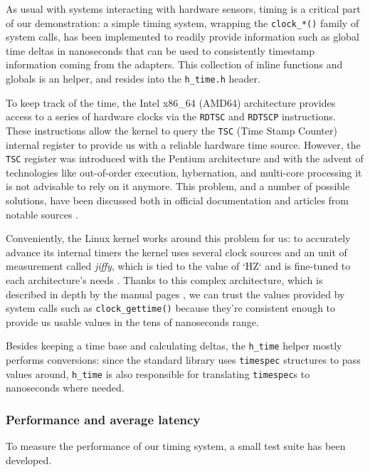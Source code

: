 \documentclass[a4paper,12pt]{report}
\begin{document}
As usual with systems interacting with hardware sensors, timing is a critical part of our demonstration: a simple timing system, wrapping the \texttt{clock\_*()} family of system calls, has been implemented to readily provide information such as global time deltas in nanoseconds that can be used to consistently timestamp information coming from the adapters. This collection of inline functions and globals is an helper, and resides into the \texttt{h\_time.h} header. 

To keep track of the time, the Intel x86\_64 (AMD64) architecture provides access to a series of hardware clocks via the \texttt{RDTSC} and \texttt{RDTSCP} instructions. These instructions allow the kernel to query the \texttt{TSC} (Time Stamp Counter) internal register to provide us with a reliable hardware time source. However, the \texttt{TSC} register was introduced with the Pentium architecture and with the advent of technologies like out-of-order execution, hybernation, and multi-core processing it is not advisable to rely on it anymore. This problem, and a number of possible solutions, have been discussed both in official documentation \cite{intel-rdtsc-bench} and articles from notable sources \cite{ms-rdtsc-issues}.

Conveniently, the Linux kernel works around this problem for us: to accurately advance its internal timers the kernel uses several clock sources and an unit of measurement called \textit{jiffy}, which is tied to the value of `HZ` and is fine-tuned to each architecture's needs \cite{elinux-hrts}. Thanks to this complex architecture, which is described in depth by the manual pages \cite{man-clock-getres-2}, we can trust the values provided by system calls such as \texttt{clock\_gettime()} because they're consistent enough to provide us usable values in the tens of nanoseconds range.

Besides keeping a time base and calculating deltas, the \texttt{h\_time} helper mostly performs conversions: since the standard library uses \texttt{timespec} structures to pass values around, \texttt{h\_time} is also responsible for translating \texttt{timespec}s to nanoseconds where needed.  

\subsubsection{Performance and average latency}

To measure the performance of our timing system, a small test suite has been developed. 
\end{document}
